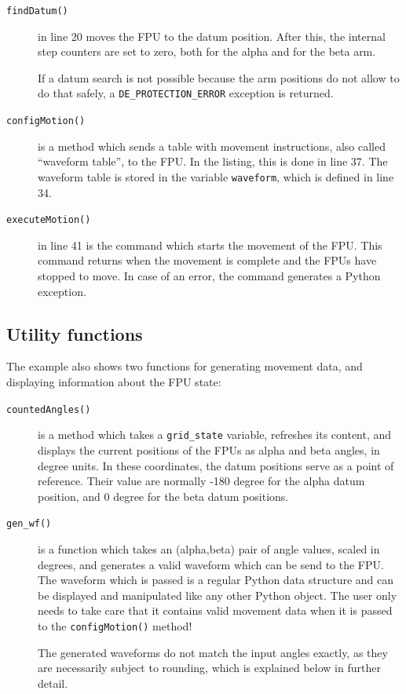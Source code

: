 \documentclass[11pt,a4paper]{report}
\begin{document}
\begin{description}
\item[\texttt{findDatum()}] in line 20 moves the FPU to the datum
  position. After this, the internal step counters are set to zero,
  both for the alpha and for the beta arm.

  If a datum search is not possible because the arm positions do not
  allow to do that safely, a \texttt{DE\_PROTECTION\_ERROR} exception
  is returned.

\item[\texttt{configMotion()}] is a method which sends a table with
  movement instructions, also called ``waveform table'', to the
  FPU. In the listing, this is done in line 37. The waveform table is
  stored in the variable \texttt{waveform}, which is defined in line
  34.

\item[\texttt{executeMotion()}] in line 41 is the command which starts
  the movement of the FPU. This command returns when the movement is
  complete and the FPUs have stopped to move. In case of an error, the
  command generates a Python exception.

\end{description}

\subsection{Utility functions}
The example also shows two  functions for generating movement
data, and displaying information about the FPU state:

\begin{description}
\item[\texttt{countedAngles()}] is a method which takes a
  \texttt{grid\_state} variable, refreshes its content, and displays
  the current positions of the FPUs as alpha and beta angles, in
  degree units. In these coordinates, the datum positions serve as a
  point of reference. Their value are normally -180 degree for the
  alpha datum position, and 0 degree for the beta datum positions.
  
\item[\texttt{gen\_wf()}] is a function which takes an (alpha,beta)
  pair of angle values, scaled in degrees, and generates a valid
  waveform which can be send to the FPU.  The waveform which is passed
  is a regular Python data structure and can be displayed and
  manipulated like any other Python object.  The user only needs to
  take care that it contains valid movement data when it is passed to
  the \texttt{configMotion()} method!

  The generated waveforms do not match the input angles exactly, as
  they are necessarily subject to rounding, which is explained below
  in further detail.

\end{description}
\end{document}
